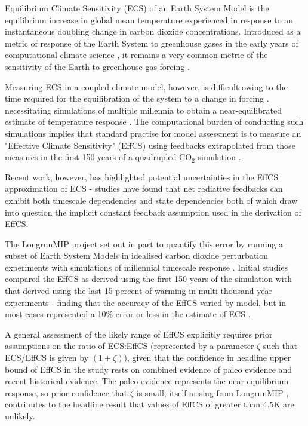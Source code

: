 \documentclass[esd, article]{copernicus}
\begin{document}


\introduction  
Equilibrium Climate Sensitivity (ECS) of an Earth System Model is the equilibrium increase in global mean temperature experienced in response to an instantaneous doubling change in carbon dioxide concentrations.  Introduced as a metric of response of the Earth System to greenhouse gases in the early years of computational climate science \citep{charney1979carbon,hansen1984climate}, it remains a very common metric of the sensitivity of the Earth to greenhouse gas forcing \cite{knutti2017beyond,stocker2013climate}.

Measuring ECS in a coupled climate model, however, is difficult owing to the time required for the equilibration of the system to a change in forcing \cite{wetherald2001committed,solomon2010persistence,jarvis2011contribution}. necessitating simulations of multiple millennia to obtain a near-equilibrated estimate of temperature response \cite{rugenstein2020equilibrium}.  The computational burden of conducting such simulations implies that standard practise for model assessment \citep{stocker2013climate,forster2016inference,andrews2012forcing} is to measure an "Effective Climate Sensitivity" (EffCS) using feedbacks extrapolated from those measures in the first 150 years of a quadrupled CO$_2$ simulation \cite{gregory2004new,murphy1995transient}.

Recent work, however, has highlighted potential uncertainties in the EffCS approximation of ECS - studies have found that net radiative feedbacks can exhibit both timescale dependencies \cite{proistosescu2017slow,andrews2018accounting} and state dependencies \citep{pfister2017state,bloch2021climate} both of which draw into question the implicit constant feedback assumption used in the derivation of EffCS.

The LongrunMIP project set out in part to quantify this error by running a subset of Earth System Models in idealised carbon dioxide perturbation experiments with simulations of millennial timescale response \citep{rugenstein2019longrunmip}.  Initial studies compared the EffCS as derived using the first 150 years of the simulation with that derived using the last 15 percent of warming in multi-thousand year experiments - finding that the accuracy of the EffCS varied by model, but in most cases represented a 10$\%$ error or less in the estimate of ECS \cite{rugenstein2020equilibrium}.

A general assessment of the likely range of EffCS \citep{sherwood2020assessment} explicitly requires prior assumptions on the ratio of ECS:EffCS (represented by a parameter $\zeta$ such that ECS/EffCS is given by $(1+\zeta)$), given that the confidence in headline upper bound of EffCS in the study rests on combined evidence of paleo evidence and recent historical evidence.  The paleo evidence represents the near-equilibrium response, so prior confidence that $\zeta$ is small, itself arising from LongrunMIP \citep{rugenstein2020equilibrium}, contributes to the headline result that values of EffCS of greater than 4.5K are unlikely.
\end{document}
